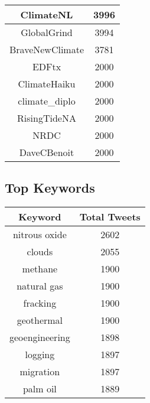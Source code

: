 \documentclass{article}\usepackage[T1]{fontenc}
\begin{document}
\begin{tabular}{|c|c|}
 \hline
ClimateNL & 3996\\ 
 \hline
GlobalGrind & 3994\\ 
 \hline
BraveNewClimate & 3781\\ 
 \hline
EDFtx & 2000\\ 
 \hline
ClimateHaiku & 2000\\ 
 \hline
climate\_diplo & 2000\\ 
 \hline
RisingTideNA & 2000\\ 
 \hline
NRDC & 2000\\ 
 \hline
DaveCBenoit & 2000\\ 
 \hline
\end{tabular}\subsection*{Top Keywords}\begin{tabular}{|c|c|}         \hline         Keyword & Total Tweets \\ 
 \hline
nitrous oxide & 2602\\ 
 \hline
clouds & 2055\\ 
 \hline
methane & 1900\\ 
 \hline
natural gas & 1900\\ 
 \hline
fracking & 1900\\ 
 \hline
geothermal & 1900\\ 
 \hline
geoengineering & 1898\\ 
 \hline
logging & 1897\\ 
 \hline
migration & 1897\\ 
 \hline
palm oil & 1889\\ 
 \hline
\end{tabular}
\end{document}
